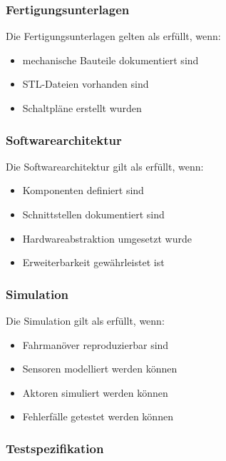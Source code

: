 \documentclass[
  a4paper,
  12pt,
  DIV=12,        %
  parskip=half,  %
  headings=small %
]{scrartcl}
\theoremstyle{definition}
\providecommand{\tightlist}{%
  \setlength{\itemsep}{0pt}\setlength{\parskip}{0pt}}
\theoremstyle{definition}
\begin{document}
\subsubsection{Fertigungsunterlagen}\label{fertigungsunterlagen}

Die Fertigungsunterlagen gelten als erfüllt, wenn:

\begin{itemize}
\tightlist
\item
  mechanische Bauteile dokumentiert sind
\item
  STL-Dateien vorhanden sind
\item
  Schaltpläne erstellt wurden
\end{itemize}

\subsubsection{Softwarearchitektur}\label{softwarearchitektur}

Die Softwarearchitektur gilt als erfüllt, wenn:

\begin{itemize}
\tightlist
\item
  Komponenten definiert sind
\item
  Schnittstellen dokumentiert sind
\item
  Hardwareabstraktion umgesetzt wurde
\item
  Erweiterbarkeit gewährleistet ist
\end{itemize}

\subsubsection{Simulation}\label{simulation-1}

Die Simulation gilt als erfüllt, wenn:

\begin{itemize}
\tightlist
\item
  Fahrmanöver reproduzierbar sind
\item
  Sensoren modelliert werden können
\item
  Aktoren simuliert werden können
\item
  Fehlerfälle getestet werden können
\end{itemize}

\subsubsection{Testspezifikation}\label{testspezifikation}
\end{document}
